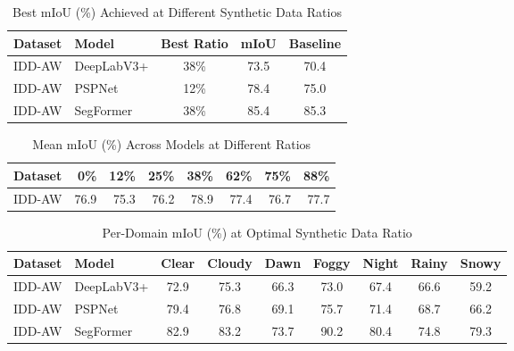 
\begin{table}[htbp]
\centering
\caption{Best mIoU (\%) Achieved at Different Synthetic Data Ratios}
\label{tab:ratio_ablation_best}
\begin{tabular}{@{}llccc@{}}
\toprule
Dataset & Model & Best Ratio & mIoU & Baseline \\
\midrule
IDD-AW & DeepLabV3+ & 38\% & 73.5 & 70.4 \\
IDD-AW & PSPNet & 12\% & 78.4 & 75.0 \\
IDD-AW & SegFormer & 38\% & 85.4 & 85.3 \\
\bottomrule
\end{tabular}
\end{table}


\begin{table}[htbp]
\centering
\caption{Mean mIoU (\%) Across Models at Different Ratios}
\label{tab:ratio_mean_performance}
\begin{tabular}{@{}lrrrrrrr@{}}
\toprule
Dataset & 0\% & 12\% & 25\% & 38\% & 62\% & 75\% & 88\% \\
\midrule
IDD-AW & 76.9 & 75.3 & 76.2 & 78.9 & 77.4 & 76.7 & 77.7 \\
\bottomrule
\end{tabular}
\end{table}


\begin{table}[htbp]
\centering
\caption{Per-Domain mIoU (\%) at Optimal Synthetic Data Ratio}
\label{tab:ratio_per_domain}
\begin{tabular}{@{}llccccccc@{}}
\toprule
Dataset & Model & Clear & Cloudy & Dawn & Foggy & Night & Rainy & Snowy \\
\midrule
IDD-AW & DeepLabV3+ & 72.9 & 75.3 & 66.3 & 73.0 & 67.4 & 66.6 & 59.2 \\
IDD-AW & PSPNet & 79.4 & 76.8 & 69.1 & 75.7 & 71.4 & 68.7 & 66.2 \\
IDD-AW & SegFormer & 82.9 & 83.2 & 73.7 & 90.2 & 80.4 & 74.8 & 79.3 \\
\bottomrule
\end{tabular}
\end{table}
